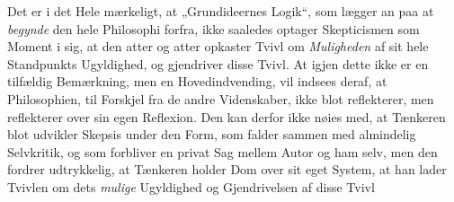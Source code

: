 \documentclass[12pt,a4paper]{book}
\begin{document}
Det er i det Hele mærkeligt, at „Grundideernes
Logik“, som lægger an paa at \emph{begynde} den hele Philosophi
forfra, ikke saaledes optager Skepticismen som
Moment i sig, at den atter og atter opkaster Tvivl om
\emph{Muligheden} af sit hele Standpunkts Ugyldighed, og
gjendriver disse Tvivl. At igjen dette ikke er en tilfældig
Bemærkning, men en Hovedindvending, vil indsees
deraf, at Philosophien, til Forskjel fra de andre
Videnskaber, ikke blot reflekterer, men reflekterer over sin
egen Reflexion. Den kan derfor ikke nøies med, at
Tænkeren blot udvikler Skepsis under den Form, som
falder sammen med almindelig Selvkritik, og som
forbliver en privat Sag mellem Autor og ham selv,
men den fordrer udtrykkelig, at Tænkeren holder Dom
over sit eget System, at han lader Tvivlen om dets
\emph{mulige} Ugyldighed og Gjendrivelsen af disse Tvivl
\end{document}
